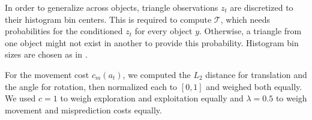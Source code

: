 \documentclass[letterpaper, 10 pt, conference]{ieeeconf}  %
\newcommand{\meshheight}{2cm}
\begin{document}

In order to generalize across objects, triangle observations $z_t$ are discretized to their histogram bin centers. This is required to compute $\mathcal{T}$, which needs probabilities for the conditioned $z_t$ for every object $y$. Otherwise, a triangle from one object might not exist in another to provide this probability. Histogram bin sizes are chosen as in \cite{triangles}.

For the movement cost $c_m(a_t)$, we computed the $L_2$ distance for translation and the angle for rotation, then normalized each to $[0, 1]$ and weighed both equally.
We used $c=1$ to weigh exploration and exploitation equally and $\lambda = 0.5$ to weigh movement and misprediction costs equally.



\begin{comment}
\begin{figure*}[thbp]
  \begin{center}
  \begin{tabular}{c}
    \texttt{[image: imgs/cup\_4536abec]}
    \texttt{[image: imgs/teapot\_45398b0a]}
    \texttt{[image: imgs/bottle\_20b7a]}
    \texttt{[image: imgs/bowl\_685825]}
    \texttt{[image: imgs/mug\_bed29ba]}
    \texttt{[image: imgs/toilet\_paper\_c34a11]}
    \texttt{[image: imgs/sphere\_3cm]} \\
  \end{tabular}
  \end{center}
  \caption{Synthetic objects and their ground truth histogram descriptors for recognition in the physics engine. Best viewed in color. We tried to represent relative sizes of objects, but they are not to exact scale. Note the similarities between object shapes \textit{e.g.} mug and toilet paper; cup, teapot, and mug; cup and sphere.}
  \label{fig:sim_objs}
\end{figure*}
\end{comment}
\end{document}
